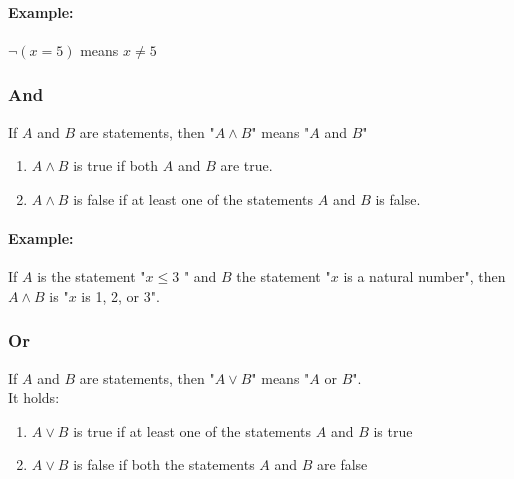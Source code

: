 \documentclass[twocolumn]{article}
\begin{document}

			\paragraph{Example:}
				$\neg(x=5)$ means $x\not=5$
			
		\subsubsection{And}
			If $A$ and $B$ are statements, then "$A\wedge B$" means "$A$ and $B$"
			\begin{enumerate}
			\item $A\wedge B$ is true if both $A$ and $B$ are true.
			\item $A\wedge B$ is false if at least one of the statements $A$ and $B$
				is false.
			\end{enumerate}
			\paragraph{Example:}
				If $A$ is the statement "$x\le3$ " and $B$ the statement "$x$ 
				is a natural number", then $A\wedge B$ is "$x$ is 1, 2, or 3".

		\subsubsection{Or}
			If $A$ and $B$ are statements, then "$A\vee B$" means "$A$ or $B$".\\
			It holds:
			\begin{enumerate}
			\item $A\vee B$ is true if at least one of the statements $A$ and $B$ 
				is true
			\item $A\vee B$ is false if both the statements $A$ and $B$ are false	
			\end{enumerate}
			
\end{document}
